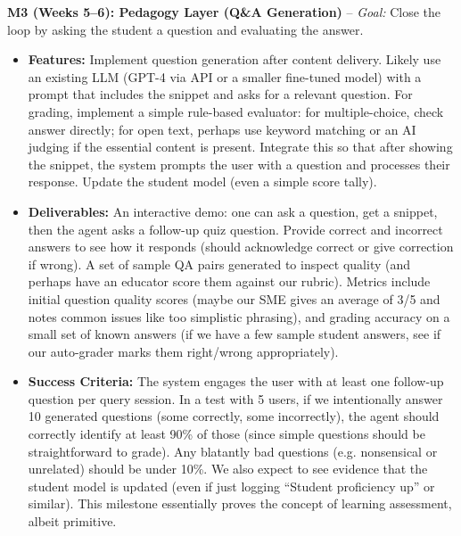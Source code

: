 \documentclass[11pt]{article}
\begin{document}
\textbf{M3 (Weeks 5–6): Pedagogy Layer (Q\&A Generation)} – \textit{Goal:} Close the loop by asking the student a question and evaluating the answer.
  \begin{itemize}
    \item \textbf{Features:} Implement question generation after content delivery. Likely use an existing LLM (GPT-4 via API or a smaller fine-tuned model) with a prompt that includes the snippet and asks for a relevant question. For grading, implement a simple rule-based evaluator: for multiple-choice, check answer directly; for open text, perhaps use keyword matching or an AI judging if the essential content is present. Integrate this so that after showing the snippet, the system prompts the user with a question and processes their response. Update the student model (even a simple score tally).
    \item \textbf{Deliverables:} An interactive demo: one can ask a question, get a snippet, then the agent asks a follow-up quiz question. Provide correct and incorrect answers to see how it responds (should acknowledge correct or give correction if wrong). A set of sample QA pairs generated to inspect quality (and perhaps have an educator score them against our rubric). Metrics include initial question quality scores (maybe our SME gives an average of 3/5 and notes common issues like too simplistic phrasing), and grading accuracy on a small set of known answers (if we have a few sample student answers, see if our auto-grader marks them right/wrong appropriately).
    \item \textbf{Success Criteria:} The system engages the user with at least one follow-up question per query session. In a test with 5 users, if we intentionally answer 10 generated questions (some correctly, some incorrectly), the agent should correctly identify at least 90\% of those (since simple questions should be straightforward to grade). Any blatantly bad questions (e.g. nonsensical or unrelated) should be under 10\%. We also expect to see evidence that the student model is updated (even if just logging “Student proficiency up” or similar). This milestone essentially proves the concept of learning assessment, albeit primitive.
  \end{itemize}
\end{document}
